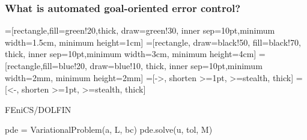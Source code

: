 \begin{frame}[fragile]
  \frametitle{What is automated goal-oriented error control?}

  \begin{center}
    =[rectangle,fill=green!20,thick, draw=green!30,
      inner sep=10pt,minimum width=1.5cm, minimum height=1cm]
    =[rectangle, draw=black!50, fill=black!70, thick,
      inner sep=10pt,minimum width=3cm, minimum height=4cm]
    =[rectangle,fill=blue!20, draw=blue!10, thick,
      inner sep=10pt,minimum width=2mm, minimum height=2mm]
    =[->, shorten >=1pt, >=stealth, thick]
    =[<-, shorten >=1pt, >=stealth, thick]



  \end{center}
  \begin{block}{FEniCS/DOLFIN}
    \vspace{-1em}
    \begin{python}
pde = VariationalProblem(a, L, bc)
pde.solve(u, tol, M)
    \end{python}
  \end{block}
\end{frame}
